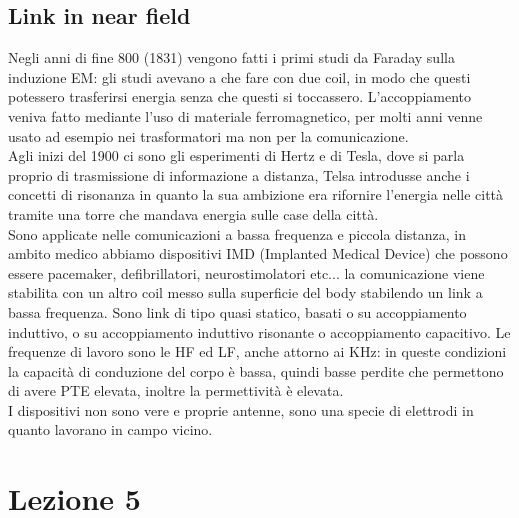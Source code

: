 \documentclass[oneside, 12pt]{extbook}
\begin{document}
\section{Link in near field}
Negli anni di fine 800 (1831) vengono fatti i primi studi da Faraday sulla induzione EM: gli studi avevano a che fare con due coil, in modo che questi potessero trasferirsi energia senza che questi si toccassero. L'accoppiamento veniva fatto mediante l'uso di materiale ferromagnetico, per molti anni venne usato ad esempio nei trasformatori ma non per la comunicazione.\\Agli inizi del 1900 ci sono gli esperimenti di Hertz e di Tesla, dove si parla proprio di trasmissione di informazione a distanza, Telsa introdusse anche i concetti di risonanza in quanto la sua ambizione era rifornire l'energia nelle città tramite una torre che mandava energia sulle case della città.\\Sono applicate nelle comunicazioni a bassa frequenza e piccola distanza, in ambito medico abbiamo dispositivi IMD (Implanted Medical Device) che possono essere pacemaker, defibrillatori, neurostimolatori etc... la comunicazione viene stabilita con un altro coil messo sulla superficie del body stabilendo un link a bassa frequenza. Sono link di tipo quasi statico, basati o su accoppiamento induttivo, o su accoppiamento induttivo risonante o accoppiamento capacitivo. Le frequenze di lavoro sono le HF ed LF, anche attorno ai KHz: in queste condizioni la capacità di conduzione del corpo è bassa, quindi basse perdite che permettono di avere PTE elevata, inoltre la permettività è elevata.\\I dispositivi non sono vere e proprie antenne, sono una specie di elettrodi in quanto lavorano in campo vicino.
\chapter{Lezione 5}
\end{document}
